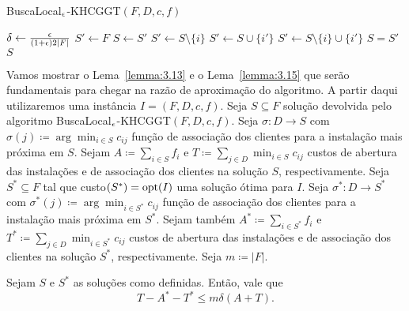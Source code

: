 \begin{algorithm}
    \caption{\sc BuscaLocal$_\epsilon$-KHCGGT$(F,D,c,f)$}
    \begin{algorithmic}[1]
        \State $\delta \gets \frac{\epsilon}{(1+\epsilon)2|F|}$
        \State $ S' \gets F $ 
        \Repeat
        \State $S\gets S'$
        \State $S' \gets S \setminus \{i\}$
        \EndIf
        \State $S' \gets S \cup \{i'\}$
        \EndIf
        \State $S' \gets S \setminus \{i\} \cup \{i'\}$
        \EndIf
        \Until $S=S'$
        \State \Return $S$
    \end{algorithmic}
\end{algorithm}
Vamos mostrar o Lema~\ref{lemma:3.13} e o Lema~\ref{lemma:3.15} que serão fundamentais para chegar na razão de aproximação do algoritmo. A partir daqui utilizaremos uma instância $I=(F,D,c,f)$. Seja $S \subseteq F$ solução devolvida pelo algoritmo {\sc BuscaLocal$_\epsilon$-KHCGGT$(F,D,c,f)$}. Seja $\sigma : D \rightarrow S$ com $\sigma(j) \coloneqq \arg\min_{i \in S}c_{ij}$ função de associação dos clientes para a instalação mais próxima em $S$. Sejam $A \coloneqq \sum_{i \in S} f_i$ e $T \coloneqq \sum_{j\in D} \min_{i\in S}c_{ij}$ custos de abertura das instalações e de associação dos clientes na solução $S$, respectivamente. Seja $S^* \subseteq F$ tal que custo$(S^*) =\mathrm{opt}(I)$ uma solução ótima para $I$. Seja $\sigma^* : D \rightarrow S^*$ com $\sigma^*(j) \coloneqq \arg\min_{i \in S^*}c_{ij}$ função de associação dos clientes para a instalação mais próxima em $S^*$. Sejam também $A^* \coloneqq \sum_{i \in S^*} f_i$ e $T^* \coloneqq \sum_{j\in D} \min_{i\in S^*}c_{ij}$ custos de abertura das instalações e de associação dos clientes na solução $S^*$, respectivamente. Seja $m \coloneqq |F|$.

\begin{lemma}
    \label{lemma:3.13}
    Sejam $S$ e $S^*$ as soluções como definidas. Então, vale que
    \[ T - A^* - T^* \leq m \delta (A+T).\]
\end{lemma}

